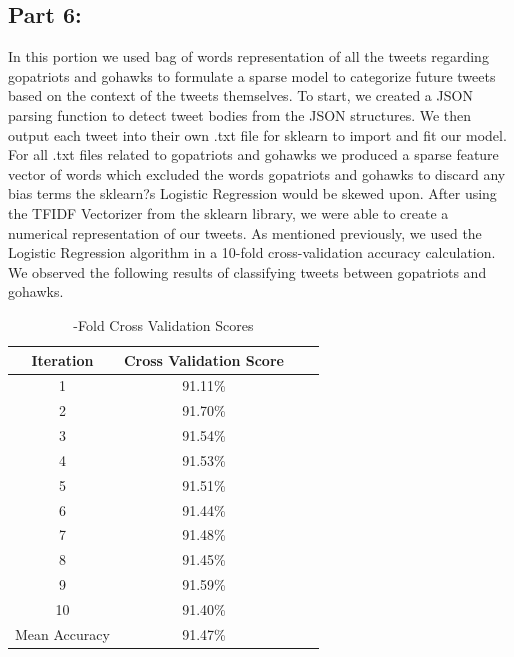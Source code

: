 \documentclass[12pt]{article}
\begin{document}
\subsection{Part 6:}
In this portion we used bag of words representation of all the tweets regarding gopatriots and gohawks to formulate a sparse model to categorize future tweets based on the context of the tweets themselves. To start, we created a JSON parsing function to detect tweet bodies from the JSON structures. We then output each tweet into their own .txt file for sklearn to import and fit our model. For all .txt files related to gopatriots and gohawks we produced a sparse feature vector of words which excluded the words gopatriots and gohawks to discard any bias terms the sklearn?s Logistic Regression would be skewed upon. After using the TFIDF Vectorizer from the sklearn library, we were able to create a numerical representation of our tweets. As mentioned previously, we used the Logistic Regression algorithm in a 10-fold cross-validation accuracy calculation. We observed the following results of classifying tweets between gopatriots and gohawks.

\begin{table}[H]
	\centering
	\begin{tabular}{| c | c | c | c |}
		\hline 
		Iteration & Cross Validation Score \\\hline
		1 & 91.11\% \\\hline
		2 & 91.70\% \\\hline 
		3 & 91.54\% \\\hline
		4 & 91.53\% \\\hline
		5 & 91.51\% \\\hline
		6 & 91.44\% \\\hline
		7 & 91.48\% \\\hline
		8 & 91.45\% \\\hline
		9 & 91.59\% \\\hline
		10 & 91.40\% \\\hline
		Mean Accuracy & 91.47\% \\\hline

	\end{tabular} 
	\caption{-Fold Cross Validation Scores}
	\label{part1:tab1}
\end{table} 
\end{document}
